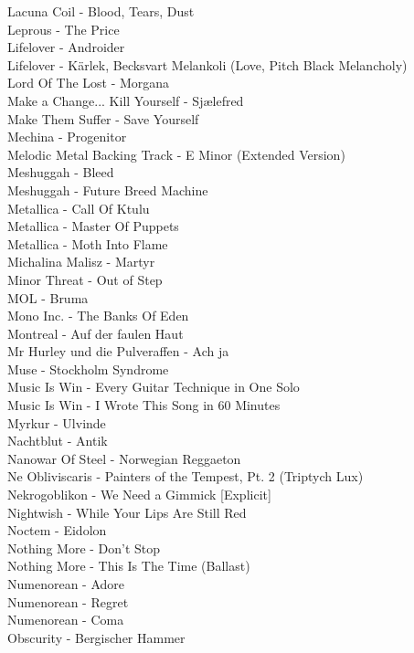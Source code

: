 Lacuna Coil - Blood, Tears, Dust\\
Leprous - The Price\\
Lifelover - Androider\\
Lifelover - Kärlek, Becksvart Melankoli (Love, Pitch Black Melancholy)\\
Lord Of The Lost - Morgana\\
Make a Change... Kill Yourself - Sjælefred\\
Make Them Suffer - Save Yourself\\
Mechina - Progenitor\\
Melodic Metal Backing Track - E Minor (Extended Version)\\
Meshuggah - Bleed\\
Meshuggah - Future Breed Machine\\
Metallica - Call Of Ktulu\\
Metallica - Master Of Puppets\\
Metallica - Moth Into Flame\\
Michalina Malisz - Martyr\\
Minor Threat - Out of Step\\
MOL - Bruma\\
Mono Inc. - The Banks Of Eden\\
Montreal - Auf der faulen Haut\\
Mr Hurley und die Pulveraffen - Ach ja\\
Muse - Stockholm Syndrome\\
Music Is Win - Every Guitar Technique in One Solo\\
Music Is Win - I Wrote This Song in 60 Minutes\\
Myrkur - Ulvinde\\
Nachtblut - Antik\\
Nanowar Of Steel - Norwegian Reggaeton\\
Ne Obliviscaris - Painters of the Tempest, Pt. 2 (Triptych Lux)\\
Nekrogoblikon - We Need a Gimmick [Explicit]\\
Nightwish - While Your Lips Are Still Red\\
Noctem - Eidolon\\
Nothing More - Don't Stop\\
Nothing More - This Is The Time (Ballast)\\
Numenorean - Adore\\
Numenorean - Regret\\
Numenorean - Coma\\
Obscurity - Bergischer Hammer\\

